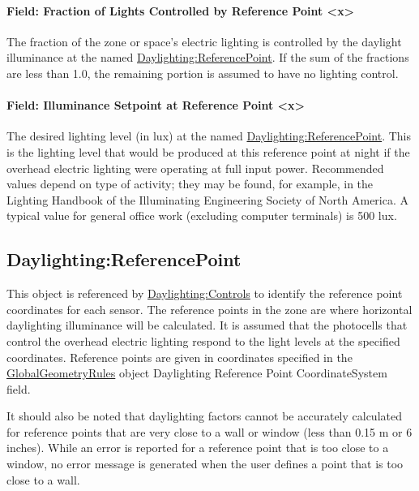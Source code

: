 \paragraph{Field: Fraction of Lights Controlled by Reference Point <x>}\label{field-fraction-of-lights-controlled-by-reference-point-x}

The fraction of the zone or space's electric lighting is controlled by the daylight illuminance at the named \hyperref[daylightingreferencepoint-000]{Daylighting:ReferencePoint}. If the sum of the fractions are less than 1.0, the remaining portion is assumed to have no lighting control.

\paragraph{Field: Illuminance Setpoint at Reference Point <x>}\label{field-illuminance-setpoint-at-reference-point-x}

The desired lighting level (in lux) at the named \hyperref[daylightingreferencepoint-000]{Daylighting:ReferencePoint}. This is the lighting level that would be produced at this reference point at night if the overhead electric lighting were operating at full input power. Recommended values depend on type of activity; they may be found, for example, in the Lighting Handbook of the Illuminating Engineering Society of North America. A typical value for general office work (excluding computer terminals) is 500 lux.

\subsection{Daylighting:ReferencePoint}\label{daylightingreferencepoint-000}

This object is referenced by \hyperref[daylightingcontrols-000]{Daylighting:Controls} to identify the reference point coordinates for each sensor. The reference points in the zone are where horizontal daylighting illuminance will be calculated. It is assumed that the photocells that control the overhead electric lighting respond to the light levels at the specified coordinates. Reference points are given in coordinates specified in the \hyperref[globalgeometryrules]{GlobalGeometryRules} object Daylighting Reference Point CoordinateSystem field.

It should also be noted that daylighting factors cannot be accurately calculated for reference points that are very close to a wall or window (less than 0.15 m or 6 inches). While an error is reported for a reference point that is too close to a window, no error message is generated when the user defines a point that is too close to a wall.


